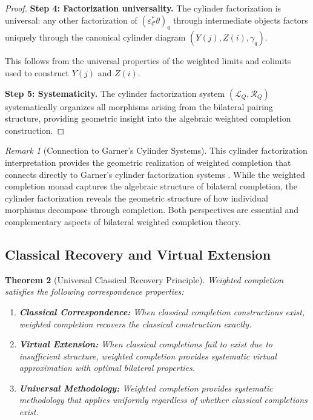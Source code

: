 \documentclass[11pt]{article}
\theoremstyle{plain}
\newtheorem{theorem}{Theorem}[section]
\theoremstyle{definition}
\theoremstyle{remark}
\newtheorem{remark}[theorem]{Remark}
\newcommand{\C}{\mathcal{C}}
\begin{document}
\begin{proof}
\textbf{Step 4: Factorization universality.}
The cylinder factorization is universal: any other factorization of $(\varepsilon_\C^* \theta)_q$ through intermediate objects factors uniquely through the canonical cylinder diagram $(Y(j), Z(i), \gamma_q)$.

This follows from the universal properties of the weighted limits and colimits used to construct $Y(j)$ and $Z(i)$.

\textbf{Step 5: Systematicity.}
The cylinder factorization system $(\mathcal{L}_Q, \mathcal{R}_Q)$ systematically organizes all morphisms arising from the bilateral pairing structure, providing geometric insight into the algebraic weighted completion construction.
\end{proof}

\begin{remark}[Connection to Garner's Cylinder Systems]
This cylinder factorization interpretation provides the geometric realization of weighted completion that connects directly to Garner's cylinder factorization systems \cite{garner2018cylinder}. While the weighted completion monad captures the algebraic structure of bilateral completion, the cylinder factorization reveals the geometric structure of how individual morphisms decompose through completion. Both perspectives are essential and complementary aspects of bilateral weighted completion theory.
\end{remark}

\subsection{Classical Recovery and Virtual Extension}

\begin{theorem}[Universal Classical Recovery Principle]\label{thm:classical-recovery}
Weighted completion satisfies the following correspondence properties:

\begin{enumerate}
\item \textbf{Classical Correspondence:} When classical completion constructions exist, weighted completion recovers the classical construction exactly.

\item \textbf{Virtual Extension:} When classical completions fail to exist due to insufficient structure, weighted completion provides systematic virtual approximation with optimal bilateral properties.

\item \textbf{Universal Methodology:} Weighted completion provides systematic methodology that applies uniformly regardless of whether classical completions exist.
\end{enumerate}
\end{theorem}
\end{document}
